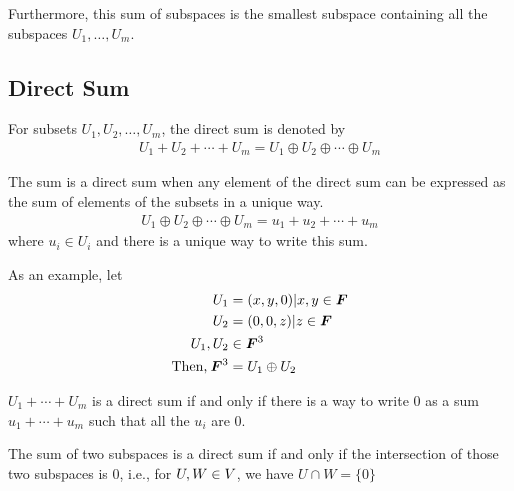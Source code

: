 \documentclass[../../linear_algebra.tex]{subfiles}
\begin{document}
Furthermore, this sum of subspaces is the smallest subspace containing all the subspaces $U_{1}, \ldots, U_{m}$.

\subsection{Direct Sum}
For subsets $U_{1}, U_{2}, \ldots, U_{m}$, the direct sum is denoted by
\begin{align*}
    U_{1} + U_{2} + \cdots + U_{m} = U_{1} \oplus U_{2} \oplus \cdots \oplus U_{m}
\end{align*}

The sum is a direct sum when any element of the direct sum can be expressed as the sum of elements of the subsets in a unique way.
\begin{align*}
    U_{1} \oplus U_{2} \oplus \cdots \oplus U_{m} = u_{1} + u_{2} + \cdots + u_{m}
\end{align*}
where $u_{i} \in U_{i}$ and there is a unique way to write this sum.\newline

As an example, let
\begin{align*}
    U_{1} &= {(x,y,0) | x,y \in \bm{F}}\\
    U_{2} &= {(0,0,z) | z \in \bm{F}}\\
    U_{1}, U_{2} &\in \bm{F}^{3}\\
    \text{Then,} \: \bm{F}^{3} &= U_{1} \oplus U_{2}
\end{align*}

$U_{1} + \cdots + U_{m}$ is a direct sum if and only if there is a way to write $0$ as a sum $u_{1} + \cdots + u_{m}$ such that all the $u_{i}$ are $0$.\newline

The sum of two subspaces is a direct sum if and only if the intersection of those two subspaces is $0$, i.e., for $U, W \in V$, we have $U \cap W = \{ 0 \}$
\end{document}
